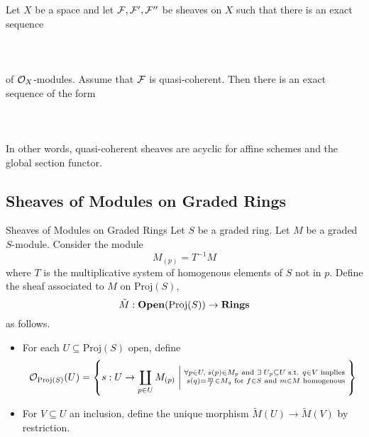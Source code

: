 \documentclass[a4paper]{article}
\begin{document}
\begin{prp}{}{} Let $X$ be a space and let $\mathcal{F},\mathcal{F}',\mathcal{F}''$ be sheaves on $X$ such that there is an exact sequence \\~\\
\\~\\
of $\mathcal{O}_X$-modules. Assume that $\mathcal{F}$ is quasi-coherent. Then there is an exact sequence of the form \\~\\
\\~\\
In other words, quasi-coherent sheaves are acyclic for affine schemes and the global section functor. 
\end{prp}

\subsection{Sheaves of Modules on Graded Rings}
\begin{defn}{Sheaves of Modules on Graded Rings}{} Let $S$ be a graded ring. Let $M$ be a graded $S$-module. Consider the module $$M_{(p)}=T^{-1}M$$ where $T$ is the multiplicative system of homogenous elements of $S$ not in $p$. Define the sheaf associated to $M$ on $\text{Proj}(S)$, $$\tilde{M}:\bold{Open}(\text{Proj}(S))\to\bold{Rings}$$ as follows. 
\begin{itemize}
\item For each $U\subseteq\text{Proj}(S)$ open, define $$\mathcal{O}_{\text{Proj}(S)}(U)=\left\{s:U\to\coprod_{p\in U}M_{(p)}\;\bigg{|}\;\substack{\forall p\in U,\;s(p)\in M_p\text{ and }\exists\;U_p\subseteq U\text{ s.t. }q\in V\text{ implies }\\s(q)=\frac{m}{f}\in M_q\text{ for }f\in S\text{ and }m\in M\text{ homogenous}}\right\}$$
\item For $V\subseteq U$ an inclusion, define the unique morphism $\tilde{M}(U)\to\tilde{M}(V)$ by restriction. 
\end{itemize}
\end{defn}
\end{document}
